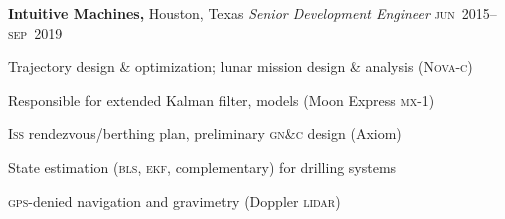 \documentclass[12pt,letterpaper]{article}
\newenvironment{itemize*}%
{\begin{itemize}%
  \setlength{\itemsep}{0pt}}%
{\end{itemize}}
\newcommand{\rdate}[1]{{\hfill #1}}
\begin{document}
\medskip
\textbf{Intuitive Machines,} Houston, Texas \newline
\emph{Senior Development Engineer} \rdate{\textsc{jun}~2015--\textsc{sep}~2019} %
\begin{itemize*}
  \item Trajectory design \& optimization; lunar mission design \& analysis (\textsc{Nova-c})%
  \item Responsible for extended Kalman filter, models (Moon Express \textsc{mx}-1)
  \item \textsc{Iss} rendezvous/berthing plan, preliminary \textsc{gn\&c} design (Axiom) %
  \item State estimation (\textsc{bls}, \textsc{ekf}, complementary) for drilling systems
  \item \textsc{gps}-denied navigation and gravimetry (Doppler \textsc{lidar})
% 
\end{itemize*}
\end{document}
